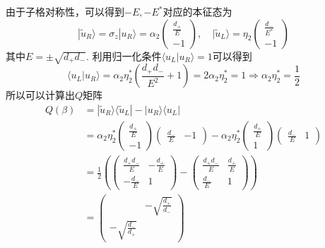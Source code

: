 \documentclass{article}
\begin{document}
由于子格对称性，可以得到$-E,-E^*$对应的本征态为
\begin{equation}
    |\tilde{u}_R\rangle=\sigma_z|u_R\rangle=\alpha_2\begin{pmatrix}
        \frac{d_+}{E}\\
        -1
    \end{pmatrix},\quad |\tilde{u}_L\rangle=\eta_2\begin{pmatrix}
        \frac{d_-}{E^*}\\
        -1
    \end{pmatrix}
\end{equation}
其中$E=\pm\sqrt{d_+d_-}$. 利用归一化条件$\langle u_L|u_R\rangle=1$可以得到
\begin{equation}
    \langle u_L|u_R\rangle=\alpha_2\eta_2^*(\frac{d_+d_-}{E^2}+1)=2\alpha_2\eta_2^*=1\Rightarrow \alpha_2\eta_2^*=\frac{1}{2}
\end{equation}
所以可以计算出$Q$矩阵
\begin{equation}
    \begin{split}
        Q(\beta)&=|\tilde{u}_R\rangle\langle\tilde{u}_L|-|u_R\rangle\langle u_L|\\
        &=\alpha_2\eta_2^*\begin{pmatrix}
            \frac{d_+}{E}\\
            -1
        \end{pmatrix}\begin{pmatrix}
            \frac{d_-}{E}&-1
        \end{pmatrix}-\alpha_2\eta_2^*\begin{pmatrix}
            \frac{d_+}{E}\\
            1
        \end{pmatrix}\begin{pmatrix}
            \frac{d_-}{E}&1
        \end{pmatrix}\\
        &=\frac{1}{2}\left(\begin{pmatrix}
            \frac{d_+d_-}{E}&-\frac{d_+}{E}\\
            -\frac{d_-}{E}&1
        \end{pmatrix}-\begin{pmatrix}
            \frac{d_+d_-}{E}&\frac{d_+}{E}\\
            \frac{d_-}{E}&1
        \end{pmatrix}\right)\\
        &=\begin{pmatrix}
            &-\sqrt{\frac{d_+}{d_-}}\\
            -\sqrt{\frac{d_-}{d_+}}&
        \end{pmatrix}
    \end{split}
\end{equation}
\end{document}
